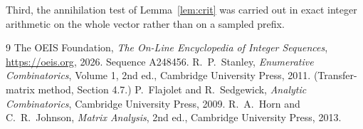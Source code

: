 \documentclass[11pt,a4paper]{article}
\theoremstyle{plain}
\theoremstyle{definition}
\begin{document}
Third, the annihilation test of Lemma~\ref{lem:crit} was carried out in exact integer
arithmetic on the whole vector rather than on a sampled prefix.

\begin{thebibliography}{9}
 The OEIS Foundation, \emph{The On-Line Encyclopedia of Integer
Sequences}, \url{https://oeis.org}, 2026. Sequence A248456.
 R.~P.~Stanley, \emph{Enumerative Combinatorics}, Volume 1, 2nd ed.,
Cambridge University Press, 2011. (Transfer-matrix method, Section 4.7.)
 P.~Flajolet and R.~Sedgewick, \emph{Analytic Combinatorics}, Cambridge
University Press, 2009.
 R.~A.~Horn and C.~R.~Johnson, \emph{Matrix Analysis}, 2nd ed., Cambridge
University Press, 2013.
\end{thebibliography}
\end{document}
